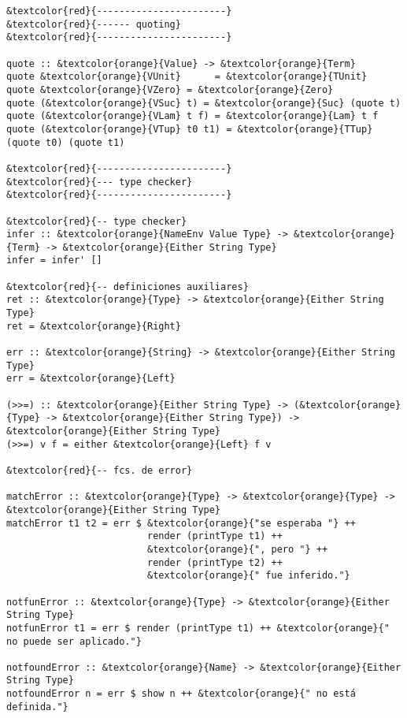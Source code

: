 \documentclass[12pt, a4paper]{article}
\begin{document}
\begin{Verbatim}[commandchars=\&\{\}]
&textcolor{red}{-----------------------}
&textcolor{red}{------ quoting}
&textcolor{red}{-----------------------}

quote :: &textcolor{orange}{Value} -> &textcolor{orange}{Term}
quote &textcolor{orange}{VUnit}      = &textcolor{orange}{TUnit}
quote &textcolor{orange}{VZero} = &textcolor{orange}{Zero}
quote (&textcolor{orange}{VSuc} t) = &textcolor{orange}{Suc} (quote t)
quote (&textcolor{orange}{VLam} t f) = &textcolor{orange}{Lam} t f
quote (&textcolor{orange}{VTup} t0 t1) = &textcolor{orange}{TTup} (quote t0) (quote t1)

&textcolor{red}{-----------------------}
&textcolor{red}{--- type checker}
&textcolor{red}{-----------------------}

&textcolor{red}{-- type checker}
infer :: &textcolor{orange}{NameEnv Value Type} -> &textcolor{orange}{Term} -> &textcolor{orange}{Either String Type}
infer = infer' []

&textcolor{red}{-- definiciones auxiliares}
ret :: &textcolor{orange}{Type} -> &textcolor{orange}{Either String Type}
ret = &textcolor{orange}{Right}

err :: &textcolor{orange}{String} -> &textcolor{orange}{Either String Type}
err = &textcolor{orange}{Left}

(>>=) :: &textcolor{orange}{Either String Type} -> (&textcolor{orange}{Type} -> &textcolor{orange}{Either String Type}) -> &textcolor{orange}{Either String Type}
(>>=) v f = either &textcolor{orange}{Left} f v

&textcolor{red}{-- fcs. de error}

matchError :: &textcolor{orange}{Type} -> &textcolor{orange}{Type} -> &textcolor{orange}{Either String Type}
matchError t1 t2 = err $ &textcolor{orange}{"se esperaba "} ++
                         render (printType t1) ++
                         &textcolor{orange}{", pero "} ++
                         render (printType t2) ++
                         &textcolor{orange}{" fue inferido."}

notfunError :: &textcolor{orange}{Type} -> &textcolor{orange}{Either String Type}
notfunError t1 = err $ render (printType t1) ++ &textcolor{orange}{" no puede ser aplicado."}

notfoundError :: &textcolor{orange}{Name} -> &textcolor{orange}{Either String Type}
notfoundError n = err $ show n ++ &textcolor{orange}{" no está definida."}


\end{Verbatim}
\end{document}
